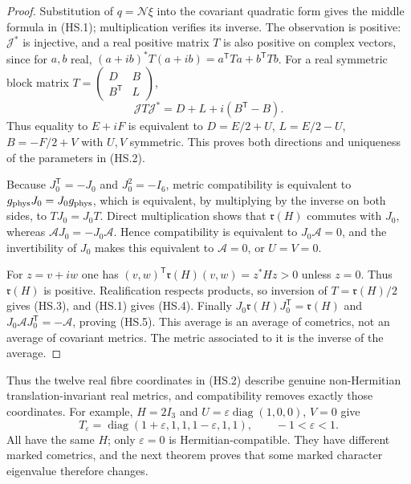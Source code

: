 \begin{proof}
Substitution of $q=\mathcal N\xi$ into the covariant quadratic form
gives the middle formula in (HS.1); multiplication verifies its inverse.
The observation is positive: $\mathcal J^*$ is injective, and a real
positive matrix $T$ is also positive on complex vectors, since for
$a,b$ real, $(a+ib)^*T(a+ib)=a^{\mathsf T}Ta+b^{\mathsf T}Tb$.
For a real symmetric block matrix
$T=\left(\begin{smallmatrix}D&B\\B^{\mathsf T}&L\end{smallmatrix}\right)$,
\[
 \mathcal JT\mathcal J^*=D+L+i(B^{\mathsf T}-B).
\]
Thus equality to $E+iF$ is equivalent to
$D=E/2+U$, $L=E/2-U$, $B=-F/2+V$ with $U,V$ symmetric.
This proves both directions and uniqueness of the parameters in (HS.2).

Because $J_0^{\mathsf T}=-J_0$ and $J_0^2=-I_6$, metric compatibility
is equivalent to $g_{\rm phys}J_0=J_0g_{\rm phys}$, which is equivalent,
by multiplying by the inverse on both sides, to $TJ_0=J_0T$.
Direct multiplication shows that $\mathfrak r(H)$ commutes with $J_0$,
whereas $\mathcal A J_0=-J_0\mathcal A$. Hence compatibility is equivalent
to $J_0\mathcal A=0$, and the invertibility of $J_0$ makes this equivalent
to $\mathcal A=0$, or $U=V=0$.

For $z=v+iw$ one has
$(v,w)^{\mathsf T}\mathfrak r(H)(v,w)=z^*Hz>0$ unless $z=0$.
Thus $\mathfrak r(H)$ is positive. Realification respects products,
so inversion of $T=\mathfrak r(H)/2$ gives (HS.3), and (HS.1) gives
(HS.4). Finally
$J_0\mathfrak r(H)J_0^{\mathsf T}=\mathfrak r(H)$ and
$J_0\mathcal AJ_0^{\mathsf T}=-\mathcal A$, proving (HS.5).
This average is an average of cometrics, not an average of covariant
metrics. The metric associated to it is the inverse of the average.
\end{proof}

Thus the twelve real fibre coordinates in (HS.2) describe genuine
non-Hermitian translation-invariant real metrics, and compatibility
removes exactly those coordinates. For example, $H=2I_3$ and
$U=\varepsilon\operatorname{diag}(1,0,0)$, $V=0$ give
\[
 T_\varepsilon=\operatorname{diag}
 (1+\varepsilon,1,1,1-\varepsilon,1,1),\qquad -1<\varepsilon<1.
\]
All have the same $H$; only $\varepsilon=0$ is Hermitian-compatible.
They have different marked cometrics, and the next theorem proves
that some marked character eigenvalue therefore changes.

